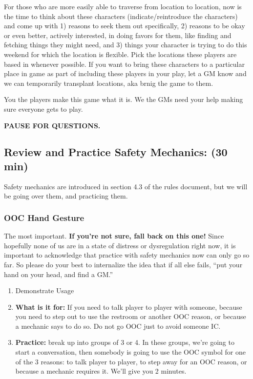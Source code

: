 \documentclass[green]{GL2020}
\begin{document}
For those who are more easily able to traverse from location to location, now is the time to think about these characters (indicate/reintroduce the characters) and come up with 1) reasons to seek them out specifically, 2) reasons to be okay or even better, actively interested, in doing favors for them, like finding and fetching things they might need, and 3) things your character is trying to do this weekend for which the location is flexible.  Pick the locations these players are based in whenever possible. If you want to bring these characters to a particular place in game as part of including these players in your play, let a GM know and we can temporarily transplant locations, aka brnig the game to them.

You the players make this game what it is. We the GMs need your help making sure everyone gets to play.

\textbf{PAUSE FOR QUESTIONS.}

\subsection*{Review and Practice Safety Mechanics: (30 min)}
Safety mechanics are introduced in section 4.3 of the rules document, but we will be going over them, and practicing them. 


\subsubsection*{OOC Hand Gesture}
The most important. \textbf{If you’re not sure, fall back on this one!} Since hopefully none of us are in a state of distress or dysregulation right now, it is important to acknowledge that practice with safety mechanics now can only go so far. So please do your best to internalize the idea that if all else fails, ``put your hand on your head, and find a GM.''

\begin{enumerate}
	\item Demonstrate Usage
	\item \textbf{What is it for:} If you need to talk player to player with someone, because you need to step out to use the restroom or another OOC reason, or because a mechanic says to do so. Do not go OOC just to avoid someone IC.
	\item \textbf{Practice:} break up into groups of 3 or 4. In these groups, we’re going to start a conversation, then somebody is going to use the OOC symbol for one of the 3 reasons: to talk player to player, to step away for an OOC reason, or because a mechanic requires it. We’ll give you 2 minutes.
\end{enumerate}
	
\end{document}

